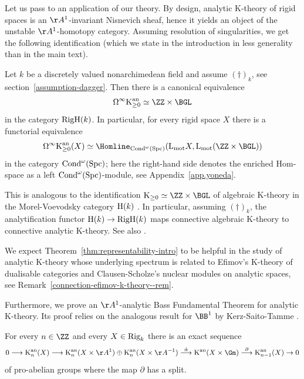 \documentclass[colorinlistoftodos,article,11pt,reqno]{article}
\newcommand{\RigH}{\textup{RigH}}
\newcommand{\Rig}{\textup{Rig}}
\newcommand{\Cond}{\textup{Cond}}
\newcommand{\Spc}{\textup{Spc}}
\newcommand{\K}{\textup{K}}
\newcommand{\Kan}{\K^\textup{an}}
\newcommand{\Arig}{\AA^{1}}
\newcommand{\Brig}{\BB^{1}}
\renewcommand{\to}[1][]{\overset{#1}{\rightarrow}}
\newcommand{\To}[1][]{\overset{#1}{\longrightarrow}}
\renewcommand{\L}{\textup{L}}
\newcommand{\Lmot}{\L_{\textup{mot}}}
\begin{document}
\vspace{6pt}\noindent 
Let us pass to an application of our theory. By design, analytic K\hyp{}theory of rigid spaces is an $\Arig$\hyp{}invariant Nisnevich sheaf, hence it yields an object of the unstable $\Arig$\hyp{}homotopy category. Assuming resolution of singularities, we get the following identification (which we state in the introduction in less generality than in the main text).

\begin{intro-theorem}[{\ref{thm:representability}}] 
\label{thm:representability-intro}
Let $k$ be a discretely valued nonarchimedean field and assume $(\dagger)_k$, see section~\ref{assumption-dagger}. Then there is a canonical equivalence
\[ \Omega^\infty\Kan_{\geq 0} \simeq \ZZ\times\BGL \]
in the category $\RigH(k)$.
In particular, for every rigid space $X$ there is a functorial equivalence
\[ \Omega^\infty\Kan_{\geq 0}(X) \simeq \Homline_{\Cond^\omega(\Spc)}(\Lmot X,\Lmot(\ZZ\times\BGL)) \]
in the category $\Cond^\omega(\Spc)$; here the right-hand side denotes the enriched Hom-space as a left $\Cond^\omega(\Spc)$-module, see Appendix~\ref{app.yoneda}.
\end{intro-theorem}

This is analogous to the identification $\K_{\geq 0} \simeq \ZZ\times\BGL$ of algebraic K-theory in the Morel-Voevodsky category $\textup{H}(k)$ \cite[Prop.~3.10]{MV1}. In particular, assuming $(\dagger)_k$, the analytification functor $\textup{H}(k)\to\RigH(k)$ maps connective algebraic K-theory to connective analytic K-theory. See also \cite[p.~ix]{AyoubRig}.

We expect Theorem~\ref{thm:representability-intro} to be helpful in the study of analytic K-theory whose underlying spectrum is related to  Efimov's K-theory of dualisable categories and Clausen-Scholze's nuclear modules on analytic spaces, see Remark~\ref{connection-efimov-k-theory--rem}.

Furthermore, we prove an $\Arig$-analytic Bass Fundamental Theorem for analytic K-theory. Its proof relies on the analogous result for $\Brig$ by Kerz-Saito-Tamme \cite[Cor.~2.6]{kst-ii}.
\begin{intro-theorem}[{\ref{bass-fundamental-theorem-for-Kan--cor}}]
For every $n\in\ZZ$ and every $X\in\Rig_k$ there is an exact sequence
\[ 0 \To \Kan_n(X) \To \Kan_n(X\times\Arig) \oplus \Kan_n(X\times\AA^{-1}) \To[\pm] \Kan(X\times\Gm) \To[\partial] \Kan_{n-1}(X) \to 0 \]
of pro-abelian groups where the map $\partial$ has a split.
\end{intro-theorem}
\end{document}
